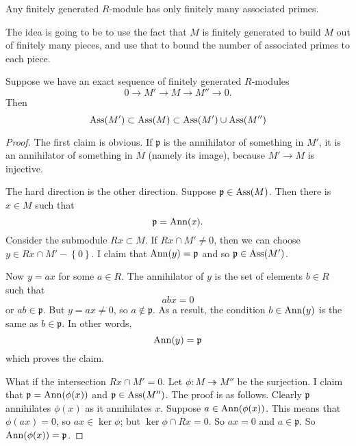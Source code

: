 \begin{proposition} \label{finiteassm}
Any finitely generated $R$-module has only finitely many associated primes.
\end{proposition}

The idea is going to be to use the fact that $M$ is finitely generated to build
$M$ out of finitely many pieces, and use that to bound the number of associated
primes to each piece.

\begin{lemma} 
Suppose we have an exact sequence of finitely generated $R$-modules
\[ 0 \to M' \to M \to M'' \to 0.  \]
Then 
\[\mathrm{Ass}(M') \subset \mathrm{Ass}(M) \subset \mathrm{Ass}(M') \cup \mathrm{Ass}(M'')  \]
\end{lemma} 
\begin{proof} 
The first claim is obvious. If $\mathfrak{p}$ is the annihilator of something
in $M'$, it is an annihilator of something in $M$ (namely its image), because
$M' \to M$ is injective. 

The hard direction is the other direction. Suppose $\mathfrak{p} \in \mathrm{Ass}(M)$.
Then there is $x \in M$ such that
\[ \mathfrak{p} = \mathrm{Ann}(x).  \]
Consider the submodule $Rx \subset M$.  If $Rx \cap M' \neq 0$, then we can
choose $y \in Rx \cap M' - \left\{0\right\}$. I claim that $\mathrm{Ann}(y) =
\mathfrak{p}$ and so $\mathfrak{p} \in \mathrm{Ass}(M')$.

Now $ y = ax$ for some $a \in R$. The annihilator of $y$ is the set of elements
$b \in R$ such that
\[ abx = 0  \]
or $ab \in \mathfrak{p}$. But $y = ax \neq 0$, so $a \notin \mathfrak{p}$. As a
result, the condition $b \in \mathrm{Ann}(y)$ is the same as $b \in \mathfrak{p}$. In
other words, 
\[ \mathrm{Ann}(y) = \mathfrak{p}  \]
which proves the claim.

What if the intersection $Rx \cap M' = 0$. Let $\phi: M \twoheadrightarrow M''$
be the surjection. I claim that $\mathfrak{p} = \mathrm{Ann}(\phi(x))$ and
$\mathfrak{p} \in \mathrm{Ass}(M'')$.  The proof is as follows. Clearly $\mathfrak{p}$
annihilates $\phi(x)$ as it annihilates $x$. Suppose $a \in \mathrm{Ann}(\phi(x))$.
This means that $\phi(ax) = 0$, so $ax \in \ker \phi$; but $\ker \phi \cap Rx =
0$. So $ax = 0$ and $a \in \mathfrak{p}$. So $\mathrm{Ann}(\phi(x)) = \mathfrak{p}$. 
\end{proof} 


